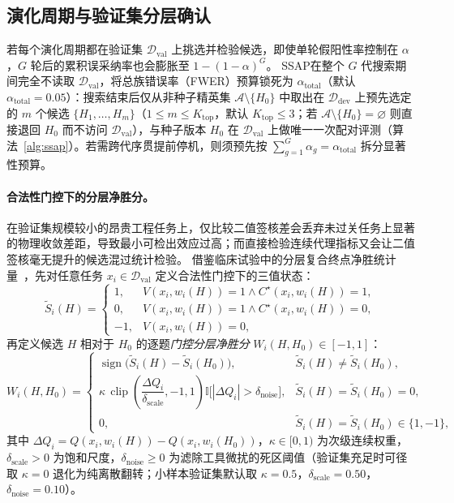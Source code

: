 \documentclass[UTF8,a4paper,10.5pt]{ctexart}
\newcommand{\method}{SSAP}
\newcommand{\Ddev}{\mathcal{D}_{\mathrm{dev}}}
\newcommand{\Dval}{\mathcal{D}_{\mathrm{val}}}
\newcommand{\Ind}{\mathbb{I}}
\newcommand{\clip}{\operatorname{clip}}
\newcommand{\sgn}{\operatorname{sign}}
\begin{document}
\subsection{演化周期与验证集分层确认}
\label{sec:confirm}

若每个演化周期都在验证集 $\Dval$ 上挑选并检验候选，即使单轮假阳性率控制在 $\alpha$，$G$ 轮后的累积误采纳率也会膨胀至 $1-(1-\alpha)^G$。
\method{}在整个 $G$ 代搜索期间完全不读取 $\Dval$，将总族错误率（FWER）预算锁死为 $\alpha_{\mathrm{total}}$（默认 $\alpha_{\mathrm{total}}=0.05$）：搜索结束后仅从非种子精英集 $\mathcal{A}\setminus\{H_0\}$ 中取出在 $\Ddev$ 上预先选定的 $m$ 个候选 $\{H_1,\dots,H_m\}$（$1\le m\le K_{\mathrm{top}}$，默认 $K_{\mathrm{top}}\le 3$；若 $\mathcal{A}\setminus\{H_0\}=\varnothing$ 则直接退回 $H_0$ 而不访问 $\Dval$），与种子版本 $H_0$ 在 $\Dval$ 上做唯一一次配对评测（算法~\ref{alg:ssap}）。若需跨代序贯提前停机，则须预先按 $\sum_{g=1}^{G}\alpha_g=\alpha_{\mathrm{total}}$ 拆分显著性预算。

\paragraph{合法性门控下的分层净胜分。}
在验证集规模较小的昂贵工程任务上，仅比较二值签核差会丢弃未过关任务上显著的物理收敛差距，导致最小可检出效应过高；而直接检验连续代理指标又会让二值签核毫无提升的候选混过统计检验。
借鉴临床试验中的分层复合终点净胜统计量~\cite{fs1999,pocock2012}，先对任意任务 $x_i\in\Dval$ 定义合法性门控下的三值状态：
\begin{equation}
  \tilde{S}_i(H) =
  \begin{cases}
    1,  & V(x_i,w_i(H))=1 \land C^\star(x_i,w_i(H))=1, \\
    0,  & V(x_i,w_i(H))=1 \land C^\star(x_i,w_i(H))=0, \\
    -1, & V(x_i,w_i(H))=0,
  \end{cases}
\end{equation}
再定义候选 $H$ 相对于 $H_0$ 的逐题\emph{门控分层净胜分} $W_i(H,H_0)\in[-1,1]$：
\begin{equation}
  W_i(H,H_0) =
  \begin{cases}
    \sgn\bigl(\tilde{S}_i(H)-\tilde{S}_i(H_0)\bigr), & \tilde{S}_i(H)\neq\tilde{S}_i(H_0), \\[4pt]
    \kappa\,\clip\!\left(\dfrac{\Delta Q_i}{\delta_{\mathrm{scale}}},-1,1\right)\Ind\bigl[|\Delta Q_i|>\delta_{\mathrm{noise}}\bigr], & \tilde{S}_i(H)=\tilde{S}_i(H_0)=0, \\[4pt]
    0, & \tilde{S}_i(H)=\tilde{S}_i(H_0)\in\{1,-1\},
  \end{cases}
  \label{eq:winmargin}
\end{equation}
其中 $\Delta Q_i=Q(x_i,w_i(H))-Q(x_i,w_i(H_0))$，$\kappa\in[0,1)$ 为次级连续权重，$\delta_{\mathrm{scale}}>0$ 为饱和尺度，$\delta_{\mathrm{noise}}\ge 0$ 为滤除工具微扰的死区阈值（验证集充足时可径取 $\kappa=0$ 退化为纯离散翻转；小样本验证集默认取 $\kappa=0.5$，$\delta_{\mathrm{scale}}=0.50$，$\delta_{\mathrm{noise}}=0.10$）。
\end{document}
